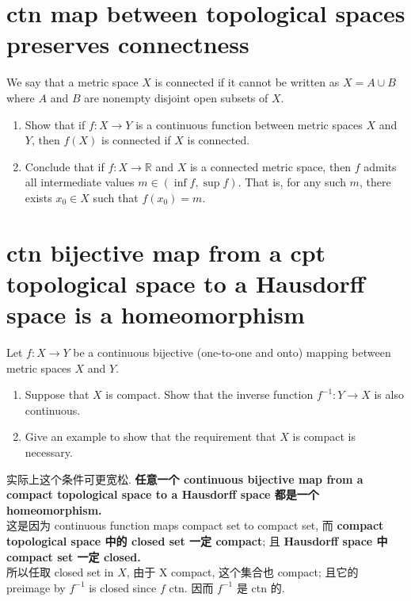 \documentclass[lang=cn,11pt]{template}
\begin{document}
\section{ctn map between topological spaces preserves connectness}
We say that a metric space \( X \) is connected if it cannot be written as \( X = A \cup B \) where \( A \) and \( B \) are nonempty disjoint open subsets of \( X \).
\begin{enumerate}
    \item Show that if \( f : X \to Y \) is a continuous function between metric spaces \( X \) and \( Y \), then \( f(X) \) is connected if \( X \) is connected.
    \item Conclude that if \( f : X \to \mathbb{R} \) and \( X \) is a connected metric space, then \( f \) admits all intermediate values \( m \in (\inf f, \sup f) \). That is, for any such \( m \), there exists \( x_0 \in X \) such that \( f(x_0) = m \).
\end{enumerate}

\section{ctn bijective map from a cpt topological space to a Hausdorff space is a homeomorphism}
Let \( f : X \to Y \) be a continuous bijective (one-to-one and onto) mapping between metric spaces \( X \) and \( Y \).
\begin{enumerate}
    \item Suppose that \( X \) is compact. Show that the inverse function \( f^{-1} : Y \to X \) is also continuous.
    \item Give an example to show that the requirement that \( X \) is compact is necessary.
\end{enumerate}
\begin{remark}
    实际上这个条件可更宽松. \textbf{任意一个 continuous bijective map from a compact topological space to a Hausdorff space 都是一个 homeomorphism.}\\
    这是因为 continuous function maps compact set to compact set, 而 \textbf{compact topological space 中的 closed set 一定 compact}; 且 \textbf{Hausdorff space 中 compact set 一定 closed.}\\ 
    所以任取 closed set in $X$, 由于 X compact, 这个集合也 compact; 且它的 preimage by $f^{-1}$ is closed since $f$ ctn. 因而 $f^{-1}$ 是 ctn 的.
\end{remark}
\end{document}
